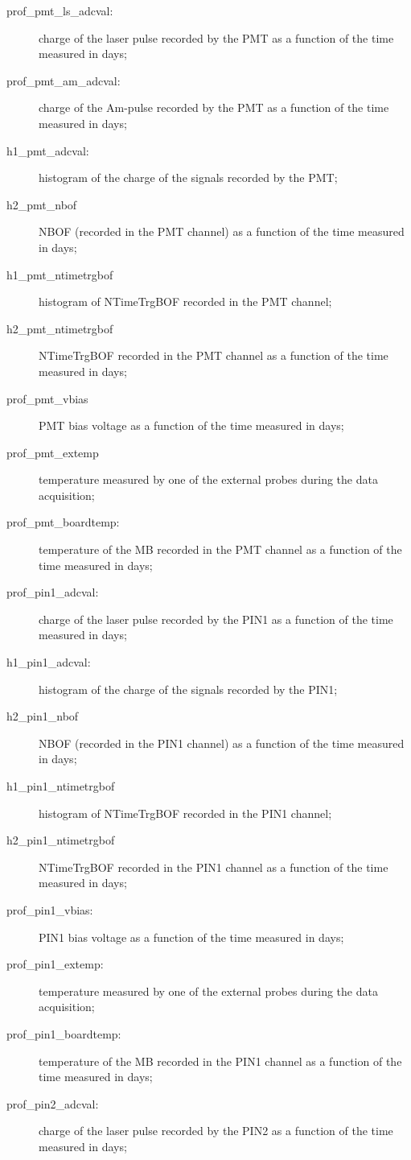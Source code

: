 \begin{description}
  \item[prof\_pmt\_ls\_adcval:]  charge of the laser pulse recorded by the PMT  as a function of the time measured in days;
  \item[prof\_pmt\_am\_adcval:] charge of the Am-pulse recorded by the PMT  as a function of the time measured in days;
  \item[h1\_pmt\_adcval:] histogram of the charge of the signals recorded by the PMT;
   \item[h2\_pmt\_nbof]  NBOF (recorded in the PMT channel) as a function of the time measured in days;
   \item[h1\_pmt\_ntimetrgbof] histogram of NTimeTrgBOF recorded in the PMT channel;
   \item[h2\_pmt\_ntimetrgbof] NTimeTrgBOF recorded in the PMT channel as a function of the time measured in days;
   \item[prof\_pmt\_vbias] PMT bias voltage as a function of the time measured in days;
   \item[prof\_pmt\_extemp] temperature measured by one of the external probes during the data acquisition;
   \item[prof\_pmt\_boardtemp:] temperature of the MB recorded in the PMT channel as a function of the time measured in days;
   \item[prof\_pin1\_adcval:]  charge of the laser pulse recorded by the PIN1  as a function of the time measured in days;
   \item[h1\_pin1\_adcval:] histogram of the charge of the signals recorded by the PIN1;
   \item[h2\_pin1\_nbof] NBOF (recorded in the PIN1 channel) as a function of the time measured in days;
   \item[h1\_pin1\_ntimetrgbof] histogram of NTimeTrgBOF recorded in the PIN1 channel;  
   \item[h2\_pin1\_ntimetrgbof]  NTimeTrgBOF recorded in the PIN1 channel as a function of the time measured in days;
   \item[prof\_pin1\_vbias:] PIN1 bias voltage as a function of the time measured in days;
   \item[prof\_pin1\_extemp:]  temperature measured by one of the external probes during the data acquisition;
   \item[prof\_pin1\_boardtemp:]  temperature of the MB recorded in the PIN1 channel as a function of the time measured in days;   
   \item[prof\_pin2\_adcval:]  charge of the laser pulse recorded by the PIN2  as a function of the time measured in days;

\end{description}

